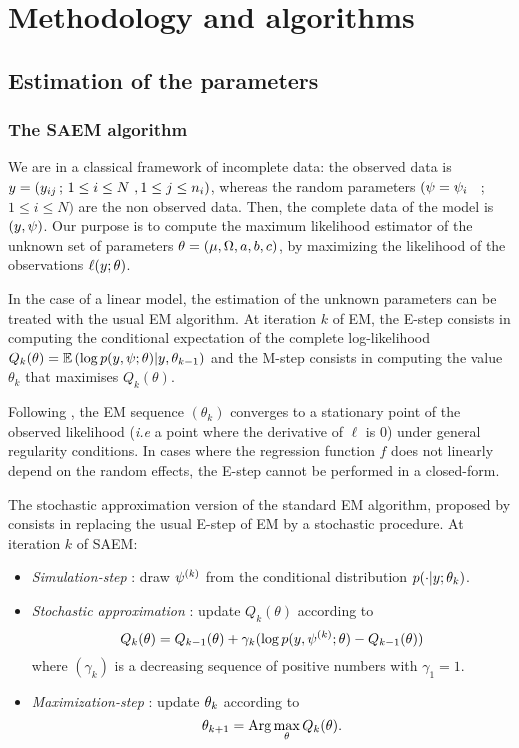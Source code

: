 
\chapter{Methodology and algorithms}  \label{chapter_methodology} \label{sec:methods}

\section{Estimation of the parameters}

\subsection{The SAEM algorithm}\label{saem}

We are in a classical framework of incomplete data: the observed data is $y=(y_{ij} \, ; \, 1  \leq i \leq N \ , 1 \leq j \leq n_i)$, whereas the random parameters $(\psi={\psi_i}$ \, ; \, $1 \leq i \leq N)$ are the non observed data. Then, the complete data of the model is $(y,\psi)$. Our purpose is to compute the maximum likelihood estimator of the unknown set of parameters $\thetag=(\fixed_effect,\IIV,\ag,\bg,\cg)$, by maximizing the likelihood of the observations $\ell(y ;\theta)$.

In the case of a linear model, the estimation of the unknown parameters can be treated with the usual EM algorithm. At iteration $k$ of EM, the E-step consists in computing the conditional expectation of the complete log-likelihood $Q_k(\theta)= \mathbb{E}\left(\log p(y,\psi;\theta) | y,\theta_{k-1} \right)$ and the M-step consists in computing the value $\theta_{k}$ that maximises $Q_k(\theta)$.

Following \cite{Dempster77,Wu83}, the EM sequence $(\theta_k)$ converges to a stationary point of the observed likelihood ({\it i.e} a point where the derivative of $\ell$ is 0) under general regularity conditions. In cases  where the regression function $f$ does not linearly depend on the random  effects, the E-step cannot be performed in a closed-form.

The stochastic approximation version  of the  standard EM  algorithm, proposed by \cite{Delyon} consists in replacing the usual E-step of EM by a stochastic procedure. At iteration $k$ of SAEM:
\begin{itemize}
\item {\em Simulation-step} : draw $\psi^{(k)}$ from the conditional distribution  $p(\cdot|y;{\theta_k})$.
\item {\em Stochastic approximation} : update $Q_k(\theta)$ according to
\begin{equation}
 Q_k(\theta) = Q_{k-1}(\theta) + \gamma_k ( \log p(y,\psi^{(k)};\theta) - Q_{k-1}(\theta) )
\end{equation}
where $(\gamma_k)$ is a decreasing sequence of positive numbers with $\gamma_1=1$. 
\item {\em Maximization-step} : update ${\theta_k}$ according to 
$${\theta_{k+1}}={\rm Arg}\max_{{\theta}} Q_k(\theta).$$
\end{itemize}


